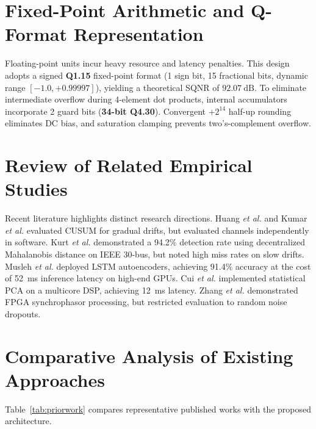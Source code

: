 \documentclass[11pt,a4paper]{report}
\begin{document}
\section{Fixed-Point Arithmetic and Q-Format Representation}
Floating-point units incur heavy resource and latency penalties. This design adopts a signed
\textbf{Q1.15} fixed-point format (1 sign bit, 15 fractional bits, dynamic range $[-1.0, +0.99997]$),
yielding a theoretical SQNR of $92.07~\text{dB}$. To eliminate intermediate overflow during 4-element
dot products, internal accumulators incorporate 2 guard bits (\textbf{34-bit Q4.30}). Convergent
$+2^{14}$ half-up rounding eliminates DC bias, and saturation clamping prevents two's-complement overflow.

\section{Review of Related Empirical Studies}
Recent literature highlights distinct research directions. Huang \textit{et al.} \cite{huang2016}
and Kumar \textit{et al.} \cite{kumar2022} evaluated CUSUM for gradual drifts, but evaluated
channels independently in software. Kurt \textit{et al.} \cite{kurt2020} demonstrated a 94.2\%
detection rate using decentralized Mahalanobis distance on IEEE 30-bus, but noted high miss rates on
slow drifts. Musleh \textit{et al.} \cite{musleh2023} deployed LSTM autoencoders, achieving 91.4\%
accuracy at the cost of 52~ms inference latency on high-end GPUs. Cui \textit{et al.} \cite{cui2024}
implemented statistical PCA on a multicore DSP, achieving 12~ms latency. Zhang \textit{et al.} \cite{zhang2024}
demonstrated FPGA synchrophasor processing, but restricted evaluation to random noise dropouts.

\section{Comparative Analysis of Existing Approaches}
Table~\ref{tab:priorwork} compares representative published works with the proposed architecture.
\end{document}
